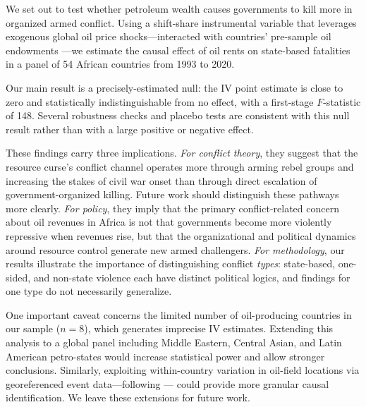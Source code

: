 \documentclass[12pt]{article}
\begin{document}
We set out to test whether petroleum wealth causes governments to kill more
in organized armed conflict.
Using a shift-share instrumental variable that leverages exogenous
global oil price shocks---interacted with countries' pre-sample oil endowments
---we estimate the causal effect of oil rents on state-based fatalities
in a panel of 54 African countries from 1993 to 2020.

Our main result is a precisely-estimated null:
the IV point estimate is close to zero and statistically indistinguishable
from no effect, with a first-stage $F$-statistic of 148.
Several robustness checks and placebo tests are consistent with
this null result rather than with a large positive or negative effect.

These findings carry three implications.
\textit{For conflict theory}, they suggest that the resource curse's
conflict channel operates more through arming rebel groups and
increasing the stakes of civil war onset than through
direct escalation of government-organized killing.
Future work should distinguish these pathways more clearly.
\textit{For policy}, they imply that the primary conflict-related
concern about oil revenues in Africa is not that governments become
more violently repressive when revenues rise, but that
the organizational and political dynamics around resource control
generate new armed challengers.
\textit{For methodology}, our results illustrate the importance of
distinguishing conflict \emph{types}: state-based, one-sided, and
non-state violence each have distinct political logics,
and findings for one type do not necessarily generalize.

One important caveat concerns the limited number of oil-producing countries
in our sample ($n = 8$), which generates imprecise IV estimates.
Extending this analysis to a global panel including Middle Eastern,
Central Asian, and Latin American petro-states would increase statistical power
and allow stronger conclusions.
Similarly, exploiting within-country variation in oil-field locations
via georeferenced event data---following \citet{kotsadam2018mining}---
could provide more granular causal identification.
We leave these extensions for future work.

\clearpage



\end{document}
